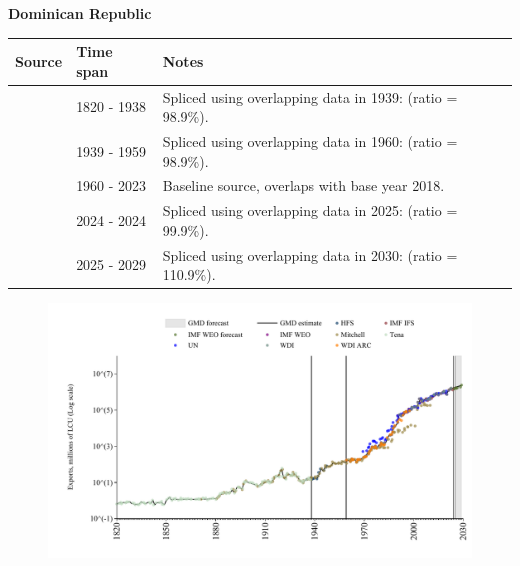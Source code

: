\documentclass[12pt,a4paper,landscape]{article}
\begin{document}
\begin{adjustbox}{max totalsize={\paperwidth}{\paperheight},center}
\begin{minipage}[t][\textheight][t]{\textwidth}
\vspace*{0.5cm}
{}
\begin{center}
{\Large\bfseries Dominican Republic}
\end{center}
\vspace{0.5cm}
\begin{table}[H]
\centering
\small
\begin{tabular}{|l|l|l|}
\hline
\textbf{Source} & \textbf{Time span} & \textbf{Notes} \\
\hline
\rowcolor{white}\cite{Tena}& 1820 - 1938 &Spliced using overlapping data in 1939: (ratio = 98.9\%).\\
\rowcolor{lightgray}\cite{Mitchell}& 1939 - 1959 &Spliced using overlapping data in 1960: (ratio = 98.9\%).\\
\rowcolor{white}\cite{WDI}& 1960 - 2023 &Baseline source, overlaps with base year 2018.\\
\rowcolor{lightgray}\cite{IMF_IFS}& 2024 - 2024 &Spliced using overlapping data in 2025: (ratio = 99.9\%).\\
\rowcolor{white}\cite{IMF_WEO_forecast}& 2025 - 2029 &Spliced using overlapping data in 2030: (ratio = 110.9\%).\\
\hline
\end{tabular}
\end{table}
\begin{figure}[H]
\centering
\includegraphics[width=\textwidth,height=0.6\textheight,keepaspectratio]{graphs/DOM_exports.pdf}
\end{figure}
\end{minipage}
\end{adjustbox}
\end{document}
